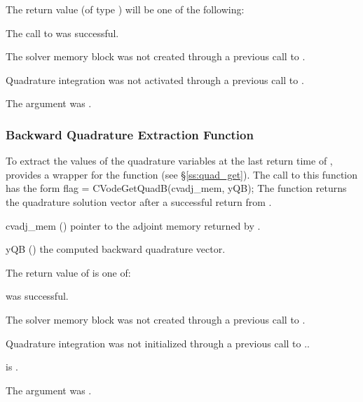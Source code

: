 {
  The return value  (of type ) will be one of the following:
  \begin{args}
  \item[\Id{CV\_SUCCESS}]
    The call to  was successful.
  \item[\Id{CV\_MEM\_NULL}] 
    The {\cvodes} solver memory block was not created through a 
    previous call to .
  \item[\Id{CV\_NO\_QUAD}] 
    Quadrature integration was not activated through a 
    previous call to .
  \item[\Id{CV\_ADJMEM\_NULL}]
    The  argument was .
  \end{args}
}
{}

\subsubsection{Backward Quadrature Extraction Function}

To extract the values of the quadrature variables at the last return time
of , {\cvodes} provides a wrapper for the function 
(see \S\ref{ss:quad_get}). The call to this function has the form
{
  flag = CVodeGetQuadB(cvadj\_mem, yQB);
}
{
  The function  returns the quadrature solution vector after
  a successful return from .
}
{
  \begin{args}
  \item[cvadj\_mem] ()
    pointer to the adjoint memory returned by .
  \item[yQB] ()
    the computed backward quadrature vector.
  \end{args}
}
{
  The return value  of  is one of:
  \begin{args}
  \item[\Id{CV\_SUCCESS}] 
     was successful.
  \item[\Id{CV\_MEM\_NULL}] 
    The {\cvodes} solver memory block was not created through a 
    previous call to .
  \item[\Id{CV\_NO\_QUAD}] 
    Quadrature integration was not initialized through a 
    previous call to ..
  \item[\Id{Cv\_BAD\_DKY}] 
     is .
  \item[\Id{CV\_ADJMEM\_NULL}]
    The  argument was .
  \end{args}
}
{}

